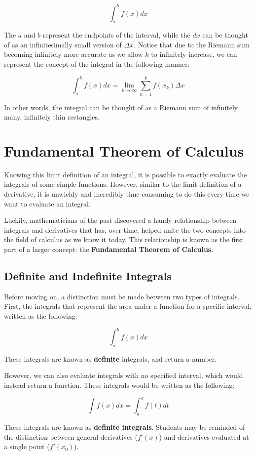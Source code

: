\documentclass[11pt]{article}
\begin{document}
\[ \int_{a}^{b} f(x) dx \]

The $a$ and $b$ represent the endpoints of the interval, while the $dx$ can be thought of as an infinitesimally small version of $\Delta x$. Notice that due to the Riemann sum becoming infinitely more accurate as we allow $k$ to infinitely increase, we can represent the concept of the integral in the following manner:

\[ \int_{a}^{b} f(x) dx = \lim_{k \to \infty} \sum_{n=1}^{k} f(x_k) \Delta x \]

In other words, the integral can be thought of as a Riemann sum of infinitely many, infinitely thin rectangles. 


\section{Fundamental Theorem of Calculus}
Knowing this limit definition of an integral, it is possible to exactly evaluate the integrals of some simple functions. However, similar to the limit definition of a derivative, it is unwieldy and incredibly time-consuming to do this every time we want to evaluate an integral. 

Luckily, mathematicians of the past discovered a handy relationship between integrals and derivatives that has, over time, helped unite the two concepts into the field of calculus as we know it today. This relationship is known as the first part of a larger concept: the \textbf{Fundamental Theorem of Calculus}.

\subsection{Definite and Indefinite Integrals}
Before moving on, a distinction must be made between two types of integrals. First, the integrals that represent the area under a function for a specific interval, written as the following:

\[ \int_{a}^{b} f(x) dx \]

These integrals are known as \textbf{definite} integrals, and return a number.

However, we can also evaluate integrals with no specified interval, which would instead return a function. These integrals would be written as the following:

\[ \int f(x) dx = \int_{a}^{x} f(t) dt \]

These integrals are known as \textbf{definite integrals}. Students may be reminded of the distinction between general derivatives ($f'(x)$) and derivatives evaluated at a single point ($f'(x_0)$). 
\end{document}
